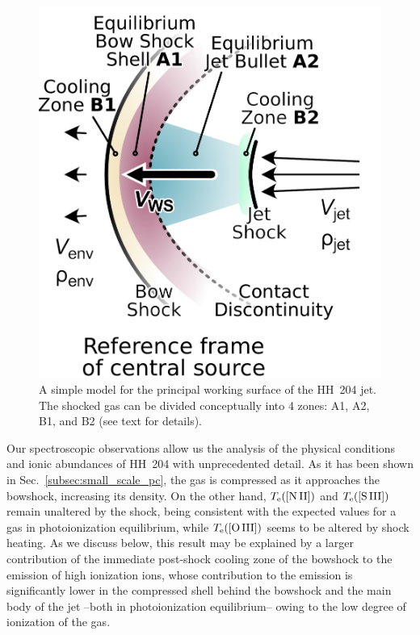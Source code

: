 \documentclass[twocolumn]{aastex63}
\begin{document}
\label{subsubsec:two_temps_model}
\begin{figure}
  \includegraphics[width=\linewidth]{working-surface-hh204-single}
  \caption{
    A simple model for the principal working surface of the HH~204 jet.
    The shocked gas can be divided conceptually into 4 zones:
    A1, A2, B1, and B2 (see text for details).
  }
  \label{fig:working-surface}
\end{figure}

Our spectroscopic observations allow us the analysis of the physical conditions and ionic abundances of HH~204 with unprecedented detail. As it has been shown in Sec.~\ref{subsec:small_scale_pc},  the gas is compressed as it approaches the bowshock, increasing its density. On the other hand, $T_{\rm e}(\text{[N\thinspace II]})$ and $T_{\rm e}(\text{[S\thinspace III]})$ remain unaltered by the shock, being consistent with the expected values for a gas in photoionization equilibrium, while $T_{\rm e}(\text{[O\thinspace III]})$ seems to be altered by shock heating. As we discuss below, this result may be explained by a larger contribution of the immediate post-shock cooling zone of the bowshock to the emission of high ionization ions, whose contribution to the emission is significantly lower in the compressed shell behind the bowshock and the main body of the jet --both in photoionization equilibrium-- owing to the low degree of ionization of the gas. 
\end{document}
